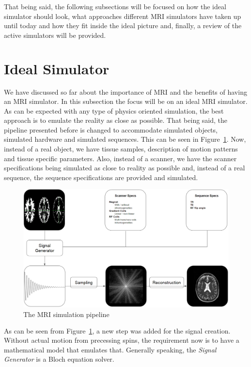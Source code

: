 That being said, the following subsections will be focused on how the ideal simulator should look, what approaches different MRI simulators have taken up until today and how they fit inside the ideal picture and, finally, a review of the active simulators will be provided.

\section{Ideal Simulator}
We have discussed so far about the importance of MRI and the benefits of having an MRI simulator. In this subsection the focus will be on an ideal MRI simulator. As can be expected with any type of physics oriented simulation, the best approach is to emulate the reality as close as possible. That being said, the pipeline presented before is changed to accommodate simulated objects, simulated hardware and simulated sequences. This can be seen in Figure~\ref{fig:mrisimscan}. Now, instead of a real object, we have tissue samples, description of motion patterns and tissue specific parameters. Also, instead of a scanner, we have the scanner specifications being simulated as close to reality as possible and, instead of a real sequence, the sequence specifications are provided and simulated.

\begin{figure}[H]
    \centering
    \includegraphics[width=1\textwidth,keepaspectratio]{mrisimscan}
    \caption{The MRI simulation pipeline}
    \label{fig:mrisimscan}
\end{figure}

As can be seen from Figure~\ref{fig:mrisimscan}, a new step was added for the signal creation. Without actual motion from precessing spins, the requirement now is to have a mathematical model that emulates that. Generally speaking, the \textit{Signal Generator} is a Bloch equation solver. 

